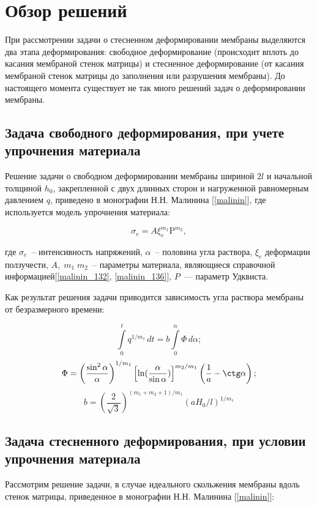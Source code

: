 \section{Обзор решений}

При рассмотрении задачи о стесненном деформировании мембраны выделяются 
два этапа деформирования: свободное деформирование (происходит вплоть до касания мембраной стенок матрицы) и стесненное деформирование (от касания мембраной стенок матрицы до заполнения или разрушения мембраны). До настоящего момента существует  не так много решений задач о деформировании мембраны.

\subsection{Задача свободного деформирования, при учете упрочнения материала}
Решение задачи о свободном деформировании мембраны шириной $2l$ и начальной толщиной $h_0$, закрепленной с двух длинных сторон и нагруженной равномерным давлением $q$, приведено в монографии Н.Н. Малинина [\ref{malinin}], где используется модель упрочнения материала:

\begin{equation}
	\sigma_e = A\xi_e^{m_1}\text{P}^{m_2},
\end{equation}

где $\sigma_e$~-- интенсивность напряжений, $\alpha$~-- половина угла раствора, $\xi_e $ деформации ползучести, $A, \; m_1\; m_2$~-- параметры 
материала, являющиеся справочной информацией[\ref{malinin_132}, \ref{malinin_136}], $P$~--- параметр Удквиста. 

Как результат решения задачи приводится зависимость угла раствора мембраны от безразмерного времени:

	$$\int\limits^t_0q^{1/m_1}\,dt = b\int\limits_0^{\alpha}\Phi\,d\alpha;$$
	$$\Phi  = \left(\dfrac{\sin^2\alpha}{\alpha}\right)^{1/m_1}\left[\ln(\dfrac{\alpha}{\sin\alpha})\right]^{m_2/m_1}
	\left(\dfrac{1}{a} - \ctg \alpha \right);$$
	$$b = \left(\dfrac{2}{\sqrt 3}\right)^{(m_1+m_2+1)/m_1}(aH_0/l)^{1/m_1}$$

\subsection{Задача стесненного деформирования, при условии упрочнения материала}
Рассмотрим решение задачи, в случае идеального скольжения мембраны вдоль стенок матрицы, приведенное в 
монографии Н.Н. Малинина [\ref{malinin}]:

